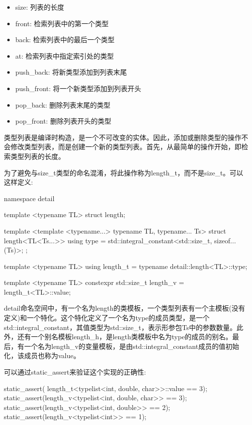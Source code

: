 \begin{itemize}
\item
size: 列表的长度

\item
front: 检索列表中的第一个类型

\item
back: 检索列表中的最后一个类型

\item
at: 检索列表中指定索引处的类型

\item
push\_back: 将新类型添加到列表末尾

\item
push\_front: 将一个新类型添加到列表开头

\item
pop\_back: 删除列表末尾的类型

\item
pop\_front: 删除列表开头的类型
\end{itemize}

类型列表是编译时构造，是一个不可改变的实体。因此，添加或删除类型的操作不会修改类型列表，而是创建一个新的类型列表。首先，从最简单的操作开始，即检索类型列表的长度。

为了避免与size\_t类型的命名混淆，将此操作称为length\_t，而不是size\_t。可以这样定义:

\begin{cpp}
namespace detail
{
	template <typename TL>
	struct length;
	
	template <template <typename...> typename TL,
			  typename... Ts>
	struct length<TL<Ts...>>
	{
		using type =
		std::integral_constant<std::size_t, sizeof...(Ts)>;
	};
}

template <typename TL>
using length_t = typename detail::length<TL>::type;

template <typename TL>
constexpr std::size_t length_v = length_t<TL>::value;
\end{cpp}

detail命名空间中，有一个名为length的类模板，一个类型列表有一个主模板(没有定义)和一个特化。这个特化定义了一个名为type的成员类型，是一个std::integral\_constant，其值类型为std::size\_t，表示形参包Ts中的参数数量。此外，还有一个别名模板length\_h，是length类模板中名为type的成员的别名。最后，有一个名为length\_v的变量模板，是由std::integral\_constant成员的值初始化，该成员也称为value。

可以通过static\_assert来验证这个实现的正确性:

\begin{cpp}
static_assert(
	length_t<typelist<int, double, char>>::value == 3);
static_assert(length_v<typelist<int, double, char>> == 3);
static_assert(length_v<typelist<int, double>> == 2);
static_assert(length_v<typelist<int>> == 1);
\end{cpp}

